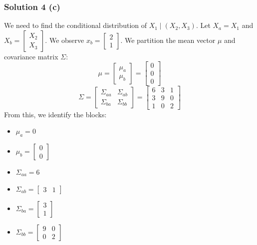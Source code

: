 \documentclass{article}
\begin{document}
\subsubsection*{Solution 4 (c)}
We need to find the conditional distribution of $X_1 \mid (X_2, X_3)$.
Let $X_a = X_1$ and $X_b = \begin{bmatrix} X_2 \\ X_3 \end{bmatrix}$. We observe $x_b = \begin{bmatrix} 2 \\ 1 \end{bmatrix}$.
We partition the mean vector $\mu$ and covariance matrix $\Sigma$:
$$ \mu = \begin{bmatrix} \mu_a \\ \mu_b \end{bmatrix} = \begin{bmatrix} 0 \\ \hline 0 \\ 0 \end{bmatrix} $$
$$ \Sigma = \begin{bmatrix} \Sigma_{aa} & \Sigma_{ab} \\ \Sigma_{ba} & \Sigma_{bb} \end{bmatrix} = \left[ \begin{array}{c|cc} 6 & 3 & 1 \\ \hline 3 & 9 & 0 \\ 1 & 0 & 2 \end{array} \right] $$
From this, we identify the blocks:
\begin{itemize}
    \item $\mu_a = 0$
    \item $\mu_b = \begin{bmatrix} 0 \\ 0 \end{bmatrix}$
    \item $\Sigma_{aa} = 6$
    \item $\Sigma_{ab} = \begin{bmatrix} 3 & 1 \end{bmatrix}$
    \item $\Sigma_{ba} = \begin{bmatrix} 3 \\ 1 \end{bmatrix}$
    \item $\Sigma_{bb} = \begin{bmatrix} 9 & 0 \\ 0 & 2 \end{bmatrix}$
\end{itemize}
\end{document}
